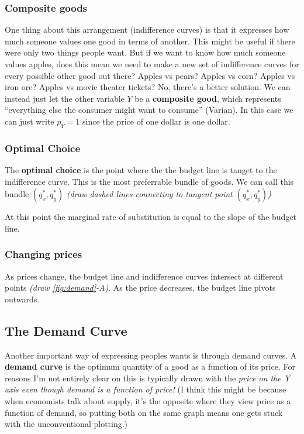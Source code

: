\documentclass[11pt]{article}
\begin{document}
\subsubsection{Composite goods}
One thing about this arrangement (indifference curves) is that it expresses how much someone values one good in terms of another. This might be useful if there were only two things people want. But if we want to know how much someone values apples, does this mean we need to make a new set of indifference curves for every possible other good out there? Apples vs pears? Apples vs corn? Apples vs iron ore? Apples vs movie theater tickets? No, there's a better solution. We can instead just let the other variable $Y$ be a {\bf composite good}, which represents ``everything else the consumer might want to consume'' (Varian). In this case we can just write $p_Y = 1$ since the price of one dollar is one dollar.

\subsubsection{Optimal Choice}

The {\bf optimal choice} is the point where the the budget line is tanget to the indifference curve. This is the most preferrable bundle of goods. We can call this bundle $(q_x^*, q_y^*)$ {\it (draw dashed lines connecting to tangent point $(q_x^*, q_y^*)$)}

At this point the marginal rate of substitution is equal to the slope of the budget line.

\subsubsection{Changing prices}

As prices change, the budget line and indifference curves intersect at different points {\it (draw \ref{fig:demand}-A)}.
As the price decreases, the budget line pivots outwards.


\subsection{The Demand Curve}

Another important way of expressing peoples wants is through demand curves. 
A {\bf demand curve} is the optimum quantity of a good as a function of its price. 
For reasons I'm not entirely clear on this is typically drawn with the {\it price on the Y axis even though demand is a function of price!}
(I think this might be because when economists talk about supply, it's the opposite where they view price as a function of demand, so putting both on the same graph means one gets stuck with the unconventional plotting.)
\end{document}
